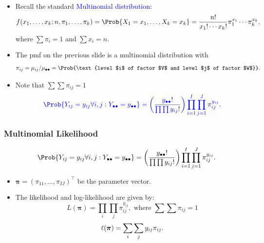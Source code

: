 \documentclass[oneside]{book}\usepackage[]{graphicx}\usepackage[svgnames]{xcolor}
\providecommand\given{} %
\renewcommand\given{\nonscript\:\delimsize\vert\nonscript\:\mathopen{}}%
\renewcommand\given{\nonscript\:\delimsize\vert\nonscript\:\mathopen{}}%
\renewcommand\given{\nonscript\:\delimsize\vert\nonscript\:\mathopen{}}%
\renewcommand\given{\nonscript\:\delimsize\vert\nonscript\:\mathopen{}}%
\renewcommand\given{\nonscript\:\delimsize\vert\nonscript\:\mathopen{}}%
\renewcommand\given{\nonscript\:\delimsize\vert\nonscript\:\mathopen{}}%
\renewcommand\given{\nonscript\:\delimsize\vert\nonscript\:\mathopen{}}%
\renewcommand\given{\nonscript\:\delimsize\vert\nonscript\:\mathopen{}}%
\renewcommand\given{\nonscript\:\delimsize\vert\nonscript\:\mathopen{}}%
\renewcommand\given{\nonscript\:\delimsize\vert\nonscript\:\mathopen{}}%
\renewcommand\given{\nonscript\:\delimsize\vert\nonscript\:\mathopen{}}%
\renewcommand\given{\nonscript\:\delimsize\vert\nonscript\:\mathopen{}}%
\let\log\relax%
\renewcommand\given{:}
\providecommand{\Vector}[1]{\bm{#1}}%
\begin{document}
\begin{itemize}
\begin{align*}
          \end{align*}
    \item Recall the standard \textcolor{Blue}{Multinomial distribution}:
          \[ f(x_1,\ldots,x_k;n,\pi_1,\ldots,\pi_k)=\Prob{X_1=x_1,\ldots,X_k=x_k}=\frac{n!}{x_1!\cdots x_k!}\pi_1^{x_1}\cdots \pi_k^{x_k}, \]
          where $ \sum \pi_i=1 $ and $ \sum x_i=n $.
    \item The pmf on the previous slide is a multinomial distribution with
          \[ \pi_{ij}=\mu_{ij}/\mu_{\bullet\bullet}=\Prob{\text{level $i$ of factor $V$ and level $j$ of factor $W$}}. \]
    \item Note that $\sum\sum \pi_{ij}=1$
          \[ \textcolor{Blue}{\Prob{Y_{ij}=y_{ij}\forall i,j\given Y_{\bullet\bullet}=y_{\bullet\bullet}}
              =\biggl(\frac{y_{\bullet\bullet}!}{\prod\prod y_{ij}!}\biggr)\prod_{i=1}^I \prod_{j=1}^J \pi_{ij}^{y_{ij}}}. \]
\end{itemize}
\subsubsection*{Multinomial Likelihood}
\[ \Prob{Y_{ij}=y_{ij}\forall i,j\given Y_{\bullet\bullet}=y_{\bullet\bullet}}
    =\biggl(\frac{y_{\bullet\bullet}!}{\prod\prod y_{ij}!}\biggr)\prod_{i=1}^I \prod_{j=1}^J \pi_{ij}^{y_{ij}}. \]
\begin{itemize}
    \item $ \Vector{\pi}=(\pi_{11},\ldots,\pi_{IJ})^\top $ be the parameter vector.
    \item The likelihood and log-likelihood are given by:
          \[ L(\Vector{\pi})=\prod_i\prod_j \pi_{ij}^{y_{ij}},\text{ where }\sum\sum \pi_{ij}=1 \]
          \[ \ell(\Vector{\pi})=\sum_i\sum_j y_{ij}\log{\pi_{ij}}. \]
\end{itemize}
\end{document}
